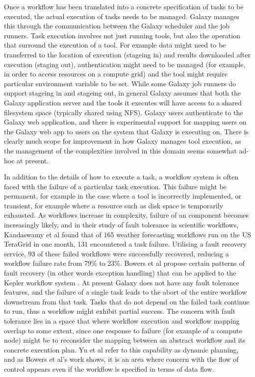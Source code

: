 \documentclass[a4paper,10pt]{scrreprt}
\begin{document}
Once a workflow has been translated into a concrete specification of tasks to be executed, the actual execution of tasks needs to be managed. Galaxy manages this through the communication between the Galaxy scheduler and the job runners. Task execution involves not just running tools, but also the operation that surround the execution of a tool. For example data might need to be transferred to the location of execution (stageing in) and results downloaded after execution (staging out), authentication might need to be managed (for example, in order to access resources on a compute grid) and the tool might require particular environment variable to be set. While some Galaxy job runners do support stageing in and stageing out, in general Galaxy assumes that both the Galaxy application server and the tools it executes will have access to a shared filesystem space (typically shared using NFS). Galaxy users authenticate to the Galaxy web application, and there is experimental support for mapping users on the 
Galaxy web app to users on the system that Galaxy is executing on. There is clearly much scope for improvement in how Galaxy manages tool execution, as the management of the complexities involved in this domain seems somewhat ad-hoc at present.

In addition to the details of how to execute a task, a workflow system is often faced with the failure of a particular task execution. This failure might be permanent, for example in the case where a tool is incorrectly implemented, or transient, for example where a resource such as disk space is temporarily exhausted. As workflows increase in complexity, failure of an component becomes increasingly likely, and in their study of fault tolerance in scientific workflows, Kandaswamy et al \cite{kandaswamy_fault_2008} found that of 165 weather forecasting workflows run on the US TeraGrid in one month, 131 encountered a task failure. Utilising a fault recovery service, 93 of these failed workflows were successfully recovered, reducing a workflow failure rate from 79\% to 23\%. Bowers et al propose certain patterns of fault recovery (in other words exception handling) that can be applied to the Kepler workflow system \cite{bowers_enabling_2006}. At present Galaxy does not have any fault tolerance features, and the 
failure of a single task leads to the abort of the entire workflow downstream from that task. Tasks that do not depend on the failed task continue to run, thus a workflow might exhibit partial success. The concern with fault tolerance lies in a space that where workflow execution and workflow mapping overlap to some extent, since one response to failure (for example of a compute node) might be to reconsider the mapping between an abstract workflow and its concrete execution plan. Yu et al refer to this capability as dynamic planning, and as Bowers et al's work shows, it is an area where concern with the flow of control appears even if the workflow is specified in terms of data flow.
\end{document}

